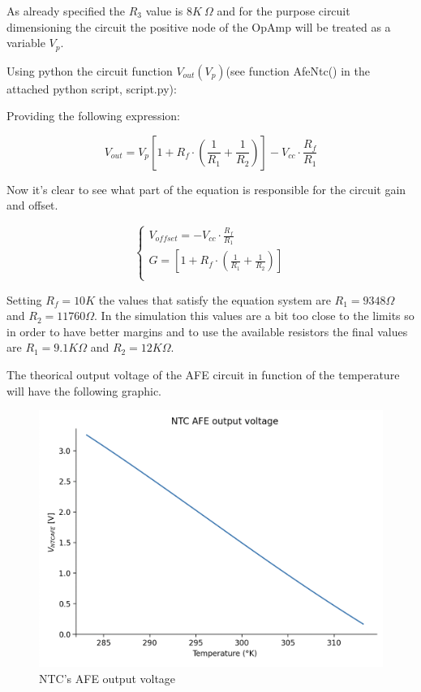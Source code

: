 \documentclass[12pt]{article}
\begin{document}
    As already specified the $R_3$ value is $8K~\Omega$ and for the purpose circuit dimensioning the circuit 
    the positive node of the OpAmp will be treated as a variable $V_p$.

    Using python the circuit function $V_{out}(V_p)$(see function AfeNtc() in the attached python script, script.py): 

       
    Providing the following expression:

    \begin{equation}
        V_{out} = V_p\left[ 1 + R_f\cdot\left(\frac{1}{R_1} + \frac{1}{R_2}\right) \right] - V_{cc}\cdot\frac{R_f}{R_1}
    \end{equation}

    Now it's clear to see what part of the equation is responsible for the circuit gain and offset.
    
    \begin{equation}
        \begin{cases}
            V_{offset} = - V_{cc}\cdot\frac{R_f}{R_1}\\
            G = \left[ 1 + R_f\cdot\left(\frac{1}{R_1} + \frac{1}{R_2}\right) \right]\\
        \end{cases}
    \end{equation}

    Setting $R_f = 10K$ the values that satisfy the equation system are $R_1 = 9348 \Omega$ and $R_2 = 11760 \Omega$.
    In the simulation this values are a bit too close to the limits so in order to have better margins and to use the available resistors
    the final values are  $R_1 = 9.1K \Omega$ and $R_2 = 12K \Omega$.

    The theorical output voltage of the AFE circuit in function of the temperature will have the
    following graphic.
    \begin{figure}[H] 
        \centering
        \includegraphics*[scale = 0.6]{images/outuptafentc.png}
        \caption{NTC's AFE output voltage}
        \label{NTCAFEgraph}
    \end{figure}
\end{document}
